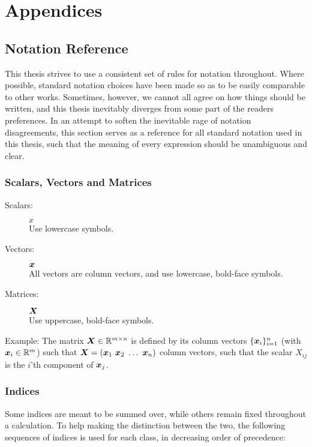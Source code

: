 \documentclass[Thesis.tex]{subfiles}
\begin{document}
\chapter{Appendices}
\renewcommand{\thesection}{\Alph{section}}
\renewcommand{\thesubsection}{\Alph{section}.\Roman{subsection}}

\section{Notation Reference}

This thesis strives to use a consistent set of rules for notation throughout.
Where possible, standard notation choices have been made so as to be easily
comparable to other works. Sometimes, however, we cannot all agree on how things
should be written, and this thesis inevitably diverges from some part of the
readers preferences. In an attempt to soften the inevitable rage of notation
disagreements, this section serves as a reference for all standard
notation used in this thesis, such that the meaning of every expression should
be unambiguous and clear.

\subsection{Scalars, Vectors and Matrices}

\begin{description}
\item[Scalars:] $x$\hfill\\
  Use lowercase symbols.
\item[Vectors:] $\bm{x}$ \hfill\\
  All vectors are column vectors, and use lowercase, bold-face symbols.
\item[Matrices:] $\bm{X}$ \hfill \\
  Use uppercase, bold-face symbols.
\end{description}

Example: The matrix $\bm{X}\in\mathbb{R}^{m\times n}$ is defined by its column
vectors $\{\bm{x}_i\}_{i=1}^n$ (with $\bm{x}_i\in\mathbb{R}^{m}$) such that $ \bm{X} =
(\bm{x}_1\ \bm{x}_2\ \dots\ \bm{x}_n)$ column vectors, such that the scalar $X_{ij}$ is
the $i$'th component of $\bm{x}_j$.

\subsection{Indices}

Some indices are meant to be summed over, while others remain fixed throughout a
calculation. To help making the distinction between the two, the following
sequences of indices is used for each class, in decreasing order of
precedence:
\end{document}
